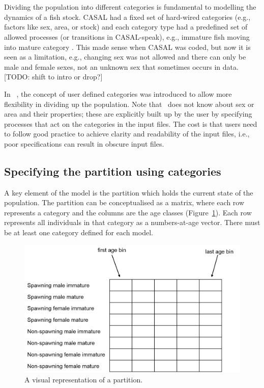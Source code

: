 \section{\label{sec:partition-categories-section}}

Dividing the population into different categories is fundamental to modelling the dynamics of a fish stock. CASAL had a fixed set of hard-wired categories (e.g., factors like sex, area, or stock) and each category type had a predefined set of allowed processes (or transitions in CASAL-speak), e.g., immature fish moving into mature category \citep{1388}. This made sense when CASAL was coded, but now it is seen as a limitation, e.g., changing sex was not allowed and there can only be male and female sexes, not an unknown sex that sometimes occurs in data. [TODO: shift to intro or drop?]

In \CNAME~, the concept of user defined categories was introduced to allow more flexibility in dividing up the population. Note that \CNAME~does not know about sex or area and their properties; these are explicitly built up by the user by specifying processes that act on the categories in the input files. The cost is that users need to follow good practice to achieve clarity and readability of the input files, i.e., poor specifications can result in obscure input files.

\subsection{Specifying the partition using categories}

A key element of the model is the partition which holds the current state of the population. The partition can be conceptualised as a matrix, where each row represents a category and the columns are the age classes (Figure~\ref{Fig:part}). Each row represents all individuals in that category as a numbers-at-age vector.  There must be at least one category defined for each model.

\begin{figure}[H]
	\centering
	\includegraphics[scale=0.4]{Figures/partition2.png}
		\caption{A visual representation of a partition.}\label{Fig:part}
\end{figure}

